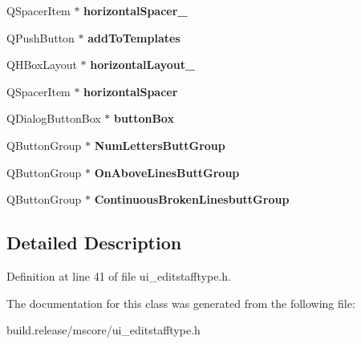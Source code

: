 \begin{DoxyCompactItemize}
Q\+Spacer\+Item $\ast$ {\bfseries horizontal\+Spacer\+\_}
\item 
\mbox{\label{class_ui___edit_staff_type_a5d131f9adbd3147a13f410fd437796a9}} 
Q\+Push\+Button $\ast$ {\bfseries add\+To\+Templates}
\item 
\mbox{\label{class_ui___edit_staff_type_a0f01ad7a15df4e987e17878be85626a2}} 
Q\+H\+Box\+Layout $\ast$ {\bfseries horizontal\+Layout\+\_}
\item 
\mbox{\label{class_ui___edit_staff_type_ab5df849e3e1ac343e740f3c676e09315}} 
Q\+Spacer\+Item $\ast$ {\bfseries horizontal\+Spacer}
\item 
\mbox{\label{class_ui___edit_staff_type_a292690a6c374e3618e177a8c6addd5df}} 
Q\+Dialog\+Button\+Box $\ast$ {\bfseries button\+Box}
\item 
\mbox{\label{class_ui___edit_staff_type_a71d90de80c9697b5cc465c656ffb0d8d}} 
Q\+Button\+Group $\ast$ {\bfseries Num\+Letters\+Butt\+Group}
\item 
\mbox{\label{class_ui___edit_staff_type_a82bc04512d8748085a8db9f0601d4c7f}} 
Q\+Button\+Group $\ast$ {\bfseries On\+Above\+Lines\+Butt\+Group}
\item 
\mbox{\label{class_ui___edit_staff_type_a9091ab061088e859741cf369cbf1856a}} 
Q\+Button\+Group $\ast$ {\bfseries Continuous\+Broken\+Linesbutt\+Group}
\end{DoxyCompactItemize}


\subsection{Detailed Description}


Definition at line 41 of file ui\+\_\+editstafftype.\+h.



The documentation for this class was generated from the following file\+:\begin{DoxyCompactItemize}
\item 
build.\+release/mscore/ui\+\_\+editstafftype.\+h\end{DoxyCompactItemize}
